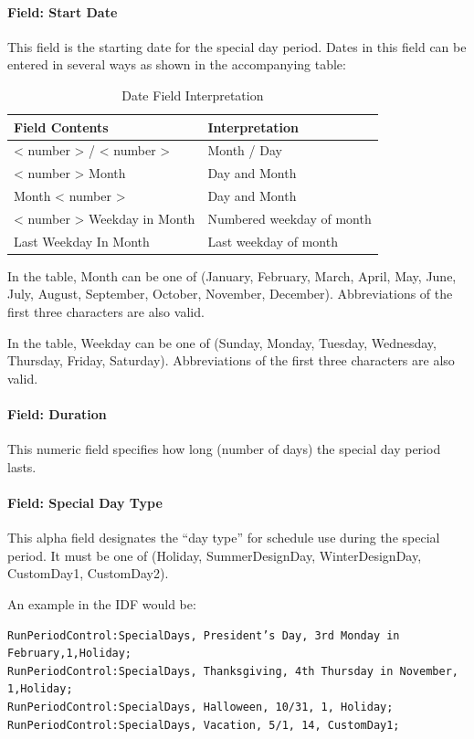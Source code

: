 \paragraph{Field: Start Date}\label{field-start-date}

This field is the starting date for the special day period. Dates in this field can be entered in several ways as shown in the accompanying table:

\begin{longtable}[c]{@{}ll@{}}
\caption{Date Field Interpretation \protect \label{table:date-field-interpretation}}\\
\toprule 
Field Contents & Interpretation \tabularnewline \midrule
\endhead
< number >  /  < number > & Month / Day \tabularnewline
< number >  Month & Day and Month \tabularnewline
Month  < number > & Day and Month \tabularnewline
< number >  Weekday in Month & Numbered weekday of month \tabularnewline
Last Weekday In Month & Last weekday of month \tabularnewline
\bottomrule
\end{longtable}

In the table, Month can be one of (January, February, March, April, May, June, July, August, September, October, November, December). Abbreviations of the first three characters are also valid.

In the table, Weekday can be one of (Sunday, Monday, Tuesday, Wednesday, Thursday, Friday, Saturday). Abbreviations of the first three characters are also valid.

\paragraph{Field: Duration}\label{field-duration}

This numeric field specifies how long (number of days) the special day period lasts.

\paragraph{Field: Special Day Type}\label{field-special-day-type}

This alpha field designates the ``day type'' for schedule use during the special period. It must be one of (Holiday, SummerDesignDay, WinterDesignDay, CustomDay1, CustomDay2).

An example in the IDF would be:

\begin{lstlisting}
RunPeriodControl:SpecialDays, President’s Day, 3rd Monday in February,1,Holiday;
RunPeriodControl:SpecialDays, Thanksgiving, 4th Thursday in November, 1,Holiday;
RunPeriodControl:SpecialDays, Halloween, 10/31, 1, Holiday;
RunPeriodControl:SpecialDays, Vacation, 5/1, 14, CustomDay1;
\end{lstlisting}

